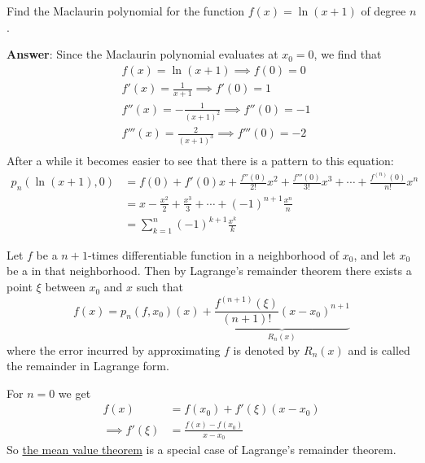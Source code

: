 \begin{exm}\label{exm-ln-taylor-series}
	Find the Maclaurin polynomial for the function $f(x)=\ln(x+1)$ of degree $n$.
	\begin{flushleft}
		\textbf{Answer}: Since the Maclaurin polynomial evaluates at $x_0=0$,
		we find that
		\begin{align*}
			 & f(x)=\ln(x+1) \implies f(0)=0                 \\
			 & f'(x)=\frac{1}{x+1} \implies f'(0)=1          \\
			 & f''(x)=-\frac{1}{(x+1)^2} \implies f''(0)=-1  \\
			 & f'''(x)=\frac{2}{(x+1)^3} \implies f'''(0)=-2 \\
		\end{align*}
		After a while it becomes easier to see that there is a pattern to this equation:
		\begin{align*}
			p_n(\ln(x+1),0) & = f(0) + f'(0)x + \frac{f''(0)}{2!}x^2 + \frac{f'''(0)}{3!}x^3 + \cdots + \frac{f^{(n)}(0)}{n!}x^n \\
			                & = x - \frac{x^2}{2} + \frac{x^3}{3} + \cdots + (-1)^{n+1}\frac{x^n}{n}                             \\
			                & = \sum_{k=1}^n (-1)^{k+1}\frac{x^k}{k}
		\end{align*}
	\end{flushleft}
\end{exm}

\begin{thm}\label{thm-taylor-lagrange-remainder-theorem}
	Let $f$ be a $n+1$-times differentiable function in a neighborhood of $x_0$,
	and let $x_0$ be a in that neighborhood. Then by Lagrange's remainder theorem
	there exists a point $\xi$ between $x_0$ and $x$ such that
	\begin{equation}\label{eq-taylor-lagrange-remainder-theorem}
		f(x) = p_n(f,x_0)(x) + \underbrace{\frac{f^{(n+1)}(\xi)}{(n+1)!}(x-x_0)^{n+1}}_{R_n(x)}
	\end{equation}
	where the error incurred by approximating $f$ is denoted by $R_n(x)$ and is
	called the remainder in Lagrange form.
\end{thm}

\begin{rem}
	For $n=0$ we get
	\begin{align*}
		f(x)             & = f(x_0) + f'(\xi)(x-x_0)   \\
		\implies f'(\xi) & = \frac{f(x)-f(x_0)}{x-x_0}
	\end{align*}
	So \hyperref[thm-mean-value-theorem]{the mean value theorem} is a special case
	of Lagrange's remainder theorem.
\end{rem}

